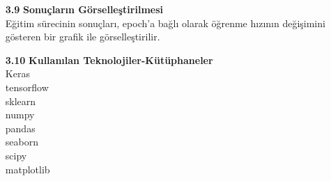 \documentclass[10pt,a4paper]{report}
\begin{document}
\begin{enumerate}
	\item[\textbf{3.9}] \textbf{Sonuçların Görselleştirilmesi} \\
		Eğitim sürecinin sonuçları, epoch'a bağlı olarak öğrenme hızının değişimini gösteren bir grafik ile görselleştirilir.
		\item[\textbf{3.10}] \textbf{Kullanılan Teknolojiler-Kütüphaneler } \\	
		Keras\\
		tensorflow\\
		sklearn	\\
		numpy\\
		pandas \\
		seaborn \\
		scipy \\
		matplotlib\\\
		\end{enumerate}
		
		\newpage
		
\end{document}
